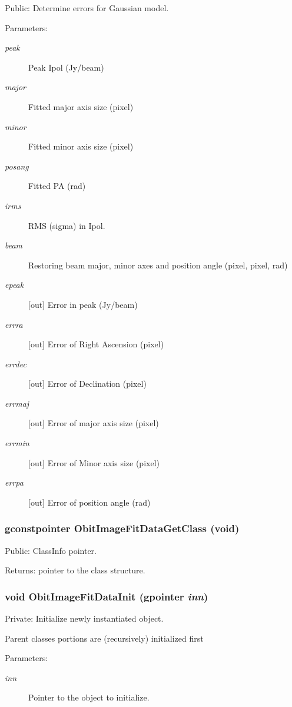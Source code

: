 Public: Determine errors for Gaussian model. 

\begin{Desc}
\item[Parameters:]
\begin{description}
\item[{\em peak}]Peak Ipol (Jy/beam) \item[{\em major}]Fitted major axis size (pixel) \item[{\em minor}]Fitted minor axis size (pixel) \item[{\em posang}]Fitted PA (rad) \item[{\em irms}]RMS (sigma) in Ipol. \item[{\em beam}]Restoring beam major, minor axes and position angle (pixel, pixel, rad) \item[{\em epeak}][out] Error in peak (Jy/beam) \item[{\em errra}][out] Error of Right Ascension (pixel) \item[{\em errdec}][out] Error of Declination (pixel) \item[{\em errmaj}][out] Error of major axis size (pixel) \item[{\em errmin}][out] Error of Minor axis size (pixel) \item[{\em errpa}][out] Error of position angle (rad) \end{description}
\end{Desc}
\subsubsection{\setlength{\rightskip}{0pt plus 5cm}gconstpointer Obit\-Image\-Fit\-Data\-Get\-Class (void)}\label{ObitImageFitData_8c_a8}


Public: Class\-Info pointer. 

\begin{Desc}
\item[Returns:]pointer to the class structure. \end{Desc}
\subsubsection{\setlength{\rightskip}{0pt plus 5cm}void Obit\-Image\-Fit\-Data\-Init (gpointer {\em inn})}\label{ObitImageFitData_8c_a3}


Private: Initialize newly instantiated object. 

Parent classes portions are (recursively) initialized first \begin{Desc}
\item[Parameters:]
\begin{description}
\item[{\em inn}]Pointer to the object to initialize. \end{description}
\end{Desc}
